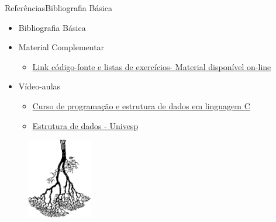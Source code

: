 \documentclass[aspectratio=169]{beamer}
\begin{document}
\begin{frame}{Referências}{Bibliografia Básica}

\begin{itemize}
\item Bibliografia Básica


\item Material Complementar
\begin{itemize}
\item \href{https://programacaodescomplicada.wordpress.com/complementar/}{Link código-fonte e listas de exercícios- Material disponível on-line}
\end{itemize}
\item Vídeo-aulas
\begin{itemize}
\item \href{https://www.youtube.com/watch?v=iLvpaqAoVD8&index=67&list=PL8iN9FQ7_jt6H5m4Gm0H89sybzR9yaaka&t=106s}{Curso de programação e estrutura de dados em linguagem C}
\item \href{https://www.youtube.com/watch?v=eiMMtyRBYCE&list=PLxI8Can9yAHf8k8LrUePyj0y3lLpigGcl&index=15}{Estrutura de dados - Univesp}
\end{itemize}
\end{itemize}
\end{frame}


\begin{frame}
\titlepage %

\begin{figure}[!h]
  \centering
   \includegraphics[width=80pt]{imagens/introducao.png}
  \label{fig_introducao}
\end{figure}
\end{frame}
\end{document}
